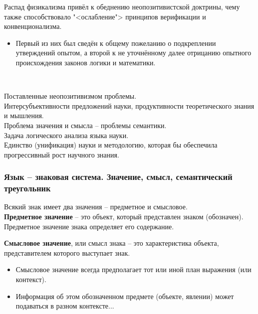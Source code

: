 \documentclass[main.tex]{subfiles}
\begin{document}
{\parindent0pt
Распад физикализма привёл к обеднению неопозитивистской доктрины, чему также способствовало "<ослабление"> принципов верификации и конвенционализма.
\begin{itemize}[nosep,leftmargin=0.5cm]
\item Первый из них был сведён к общему пожеланию о подкреплении утверждений опытом, а второй к не уточнённому далее отрицанию опытного происхождения законов логики и математики.
\end{itemize}
}
\ 

{\parindent0pt
Поставленные неопозитивизмом проблемы.
}
\ \\

{\parindent0pt
Интерсубъективности предложений науки, продуктивности теоретического знания и мышления.
}
\ \\

{\parindent0pt
Проблема значения и смысла -- проблемы семантики.
}
\ \\

{\parindent0pt
Задача логического анализа языка науки.
}
\ \\

{\parindent0pt
Единство (унификация) науки и методологию, которая бы обеспечила прогрессивный рост научного знания.
}



\subsubsection{Язык -- знаковая система. Значение, смысл, семантический треугольник}

{\parindent0pt
Всякий знак имеет два значения -- предметное и смысловое.
}
\ \\

{\parindent0pt
\textbf{Предметное значение} -- это объект, который представлен знаком (обозначен).
Предметное значение знака определяет его содержание.
}
\ \\

{\parindent0pt
\textbf{Смысловое значение}, или смысл знака -- это характеристика объекта, представителем которого выступает знак.
\begin{itemize}[nosep,leftmargin=0.5cm]
\item Смысловое значение всегда предполагает тот или иной план выражения (или контекст).
\item Информация об этом обозначенном предмете (объекте, явлении) может подаваться в разном контексте...
\end{itemize}
}
\ 
\end{document}
